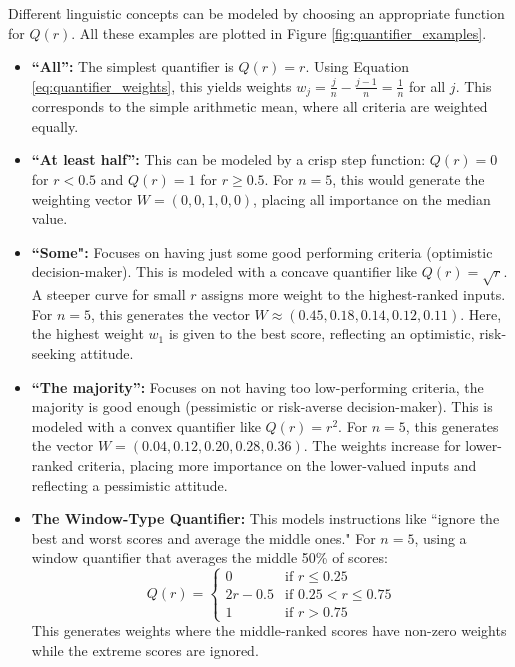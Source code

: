 \begin{example}
    Different linguistic concepts can be modeled by choosing an appropriate function for $Q(r)$. All these examples are plotted in Figure \ref{fig:quantifier_examples}.
    \begin{itemize}
        \item \textbf{``All'':} The simplest quantifier is $Q(r) = r$. Using Equation \ref{eq:quantifier_weights}, this yields weights $w_j = \frac{j}{n} - \frac{j-1}{n} = \frac{1}{n}$ for all $j$. This corresponds to the simple arithmetic mean, where all criteria are weighted equally.
        \item \textbf{``At least half'':} This can be modeled by a crisp step function: $Q(r) = 0$ for $r < 0.5$ and $Q(r) = 1$ for $r \ge 0.5$. For $n=5$, this would generate the weighting vector $W=(0, 0, 1, 0, 0)$, placing all importance on the median value.
        \item \textbf{``Some":} Focuses on having just some good performing criteria (optimistic decision-maker). This is modeled with a concave quantifier like $Q(r) = \sqrt{r}$. A steeper curve for small $r$ assigns more weight to the highest-ranked inputs. For $n=5$, this generates the vector $W \approx (0.45, 0.18, 0.14, 0.12, 0.11)$. Here, the highest weight $w_1$ is given to the best score, reflecting an optimistic, risk-seeking attitude.

        \item \textbf{``The majority'':} Focuses on not having too low-performing criteria, the majority is good enough (pessimistic or risk-averse decision-maker). This is modeled with a convex quantifier like $Q(r) = r^2$. For $n=5$, this generates the vector $W=(0.04, 0.12, 0.20, 0.28, 0.36)$. The weights increase for lower-ranked criteria, placing more importance on the lower-valued inputs and reflecting a pessimistic attitude.
        
        \item \textbf{The Window-Type Quantifier:} This models instructions like ``ignore the best and worst scores and average the middle ones." For $n=5$, using a window quantifier that averages the middle 50\% of scores:
        \[ Q(r) = \begin{cases} 0 & \text{if } r \le 0.25 \\ 2r - 0.5 & \text{if } 0.25 < r \le 0.75 \\ 1 & \text{if } r > 0.75 \end{cases} \]
        This generates weights where the middle-ranked scores have non-zero weights while the extreme scores are ignored.
    \end{itemize}
    \end{example}



